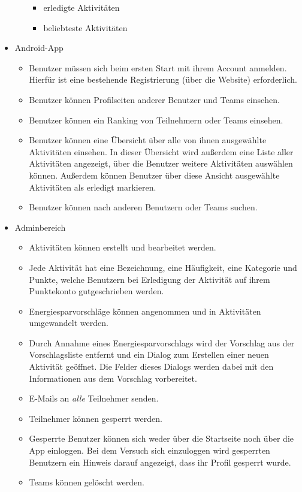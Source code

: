\documentclass[10pt,a4paper]{article}
\begin{document}
\begin{itemize}
\begin{itemize}
\begin{itemize}
				\item erledigte Aktivitäten
				\item beliebteste Aktivitäten
			\end{itemize}
		\end{itemize}
		\item Android-App
		\begin{itemize}
			\item Benutzer müssen sich beim ersten Start mit ihrem Account anmelden. Hierfür ist eine bestehende Registrierung (über die Website) erforderlich.
			\item Benutzer können Profilseiten anderer Benutzer und Teams einsehen.
			\item Benutzer können ein Ranking von Teilnehmern oder Teams einsehen.
			\item Benutzer können eine Übersicht über alle von ihnen ausgewählte Aktivitäten einsehen. In dieser Übersicht wird außerdem eine Liste aller Aktivitäten angezeigt, über die Benutzer weitere Aktivitäten auswählen können. Außerdem können Benutzer über diese Ansicht ausgewählte Aktivitäten als erledigt markieren.
			\item Benutzer können nach anderen Benutzern oder Teams suchen. 
		\end{itemize}
		\item Adminbereich
		\begin{itemize}
			\item Aktivitäten können erstellt und bearbeitet werden.
                        \item Jede Aktivität hat eine Bezeichnung, eine Häufigkeit, eine Kategorie und Punkte, welche Benutzern bei Erledigung der Aktivität auf ihrem Punktekonto gutgeschrieben werden.
			\item Energiesparvorschläge können angenommen und in Aktivitäten umgewandelt werden.
                        \item Durch Annahme eines Energiesparvorschlags wird der Vorschlag aus der Vorschlagsliste entfernt und ein Dialog zum Erstellen einer neuen Aktivität geöffnet. Die Felder dieses Dialogs werden dabei mit den Informationen aus dem Vorschlag vorbereitet.
			\item E-Mails an \emph{alle} Teilnehmer senden.
			\item Teilnehmer können gesperrt werden.
                        \item Gesperrte Benutzer können sich weder über die Startseite noch über die App einloggen. Bei dem Versuch sich einzuloggen wird gesperrten Benutzern ein Hinweis darauf angezeigt, dass ihr Profil gesperrt wurde.
                        \item Teams können gelöscht werden.
		\end{itemize}
	\end{itemize}
\end{document}
